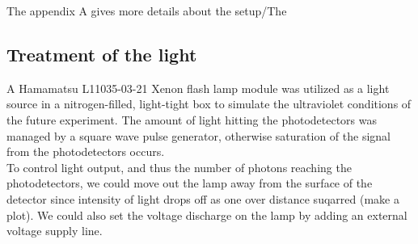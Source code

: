 \documentclass[a4paper, 11pt]{report}%
\begin{document}
  The appendix A gives more details about the setup/The 
  
  \subsection{Treatment of the light}
  
  A Hamamatsu L11035-03-21 Xenon flash lamp module was utilized as a light source in a nitrogen-filled, light-tight box to simulate the 
  ultraviolet conditions of the future experiment. 
  The amount of light hitting the photodetectors was managed by a square wave pulse generator, otherwise saturation of the signal from the 
  photodetectors occurs. 
  \\
  To control light output, and thus the number of photons reaching the photodetectors, we could move out the lamp away from the surface of the detector 
  since intensity of light drops off as one over distance suqarred (make a plot). We could also set the voltage discharge on the lamp 
  by adding an external voltage supply line. 
  
\end{document}
